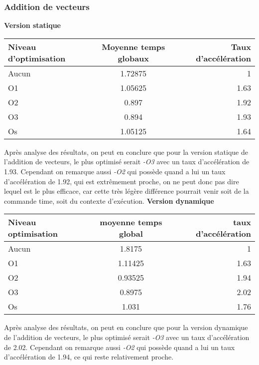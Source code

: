 \documentclass{rapport}
\begin{document}
\subsubsection{Addition de vecteurs}
\textbf{Version statique}
\begin{center}
\begin{tabular}{ l|c|r }
Niveau d'optimisation & Moyenne temps globaux & Taux d'accélération \\
\hline
Aucun & 1.72875 & 1 \\ 
O1 & 1.05625 & 1.63 \\  
O2 & 0.897 & 1.92 \\  
O3 & 0.894 & 1.93 \\  
Os & 1.05125 & 1.64
\end{tabular}
\end{center}
Après analyse des résultats, on peut en conclure que pour la version statique de l'addition de vecteurs, le plus optimisé serait \textit{-O3} avec un taux d'accélération de 1.93.
\newline Cependant on remarque aussi \textit{-O2} qui possède quand a lui un taux d'accélération de 1.92, qui est extrêmement proche, on ne peut donc pas dire lequel est le plus efficace, car cette très légère différence pourrait venir soit de la commande time, soit du contexte d'exécution.
\newline\newline
\textbf{Version dynamique}
\begin{center}
\begin{tabular}{ l|c|r }
Niveau optimisation & moyenne temps global & taux d'accélération \\
\hline
Aucun & 1.8175 & 1 \\ 
O1 & 1.11425 & 1.63 \\  
O2 & 0.93525 & 1.94 \\  
O3 & 0.8975 & 2.02 \\  
Os & 1.031 & 1.76
\end{tabular}
\end{center}
Après analyse des résultats, on peut en conclure que pour la version dynamique de l'addition de vecteurs, le plus optimisé serait \textit{-O3} avec un taux d'accélération de 2.02.
\newline Cependant on remarque aussi \textit{-O2} qui possède quand a lui un taux d'accélération de 1.94, ce qui reste relativement proche.
\end{document}

